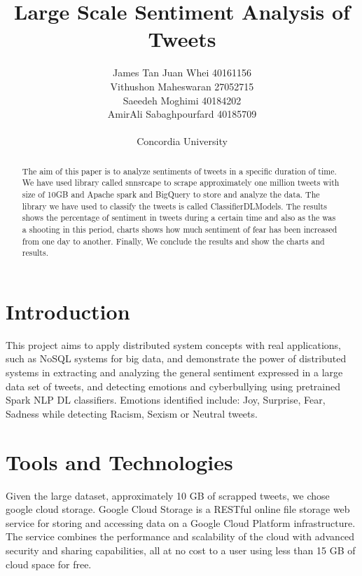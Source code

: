 \documentclass[a4paper,12pt]{article}
\begin{document}
\title{Large Scale Sentiment Analysis of Tweets }%
\author{
	James Tan Juan Whei 40161156\\
	Vithushon Maheswaran 27052715\\
	Saeedeh Moghimi 40184202\\
	AmirAli Sabaghpourfard 40185709\\
	\\Concordia University
}
\maketitle

\begin{abstract}
The aim of this paper is to analyze sentiments of tweets in a specific duration of time. We have used library called snnsrcape to
scrape approximately one million tweets with size of 10GB and Apache spark and BigQuery to store and analyze the data.
The library we have used to classify the tweets is called ClassifierDLModels. The results shows the percentage of sentiment in
tweets during a certain time and also as the was a shooting in this period, charts shows how much sentiment of fear has been increased
from one day to another. Finally, We conclude the results and show the charts and results.
\end{abstract}

\section{Introduction}
This project aims to apply distributed system concepts with real applications, such as NoSQL systems for big data,
and demonstrate the power of distributed systems in extracting and analyzing the general sentiment expressed in a large
data set of tweets, and detecting emotions and cyberbullying using pretrained Spark NLP DL classifiers.
Emotions identified include: Joy, Surprise, Fear, Sadness while detecting Racism, Sexism or Neutral tweets.

\section{Tools and Technologies}
Given the large dataset, approximately 10 GB of scrapped tweets, we chose google cloud storage.
Google Cloud Storage is a RESTful online file storage web service for storing and accessing data on a Google Cloud
Platform infrastructure. The service combines the performance and scalability of the cloud with advanced
security and sharing capabilities, all at no cost to a user using less than 15 GB of cloud space for free.
\end{document}
